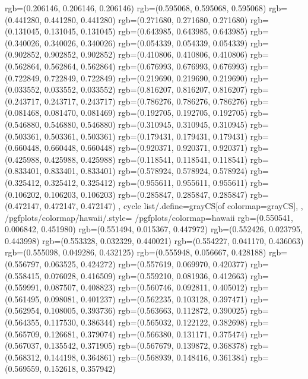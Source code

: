 {{{					rgb=(0.206146, 0.206146, 0.206146)
					rgb=(0.595068, 0.595068, 0.595068)
					rgb=(0.441280, 0.441280, 0.441280)
					rgb=(0.271680, 0.271680, 0.271680)
					rgb=(0.131045, 0.131045, 0.131045)
					rgb=(0.643985, 0.643985, 0.643985)
					rgb=(0.340026, 0.340026, 0.340026)
					rgb=(0.054339, 0.054339, 0.054339)
					rgb=(0.902852, 0.902852, 0.902852)
					rgb=(0.410806, 0.410806, 0.410806)
					rgb=(0.562864, 0.562864, 0.562864)
					rgb=(0.676993, 0.676993, 0.676993)
					rgb=(0.722849, 0.722849, 0.722849)
					rgb=(0.219690, 0.219690, 0.219690)
					rgb=(0.033552, 0.033552, 0.033552)
					rgb=(0.816207, 0.816207, 0.816207)
					rgb=(0.243717, 0.243717, 0.243717)
					rgb=(0.786276, 0.786276, 0.786276)
					rgb=(0.081468, 0.081470, 0.081469)
					rgb=(0.192705, 0.192705, 0.192705)
					rgb=(0.546880, 0.546880, 0.546880)
					rgb=(0.310945, 0.310945, 0.310945)
					rgb=(0.503361, 0.503361, 0.503361)
					rgb=(0.179431, 0.179431, 0.179431)
					rgb=(0.660448, 0.660448, 0.660448)
					rgb=(0.920371, 0.920371, 0.920371)
					rgb=(0.425988, 0.425988, 0.425988)
					rgb=(0.118541, 0.118541, 0.118541)
					rgb=(0.833401, 0.833401, 0.833401)
					rgb=(0.578924, 0.578924, 0.578924)
					rgb=(0.325412, 0.325412, 0.325412)
					rgb=(0.955611, 0.955611, 0.955611)
					rgb=(0.106202, 0.106203, 0.106203)
					rgb=(0.285847, 0.285847, 0.285847)
					rgb=(0.472147, 0.472147, 0.472147)
			},
		cycle list/.define={grayCS}{[of colormap=grayCS]},
		},
		/pgfplots/colormap/hawaii/.style={
			/pgfplots/colormap={hawaii}{%
					rgb=(0.550541, 0.006842, 0.451980)
					rgb=(0.551494, 0.015367, 0.447972)
					rgb=(0.552426, 0.023795, 0.443998)
					rgb=(0.553328, 0.032329, 0.440021)
					rgb=(0.554227, 0.041170, 0.436063)
					rgb=(0.555098, 0.049286, 0.432125)
					rgb=(0.555948, 0.056667, 0.428188)
					rgb=(0.556797, 0.063525, 0.424272)
					rgb=(0.557619, 0.069970, 0.420377)
					rgb=(0.558415, 0.076028, 0.416509)
					rgb=(0.559210, 0.081936, 0.412663)
					rgb=(0.559991, 0.087507, 0.408823)
					rgb=(0.560746, 0.092811, 0.405012)
					rgb=(0.561495, 0.098081, 0.401237)
					rgb=(0.562235, 0.103128, 0.397471)
					rgb=(0.562954, 0.108005, 0.393736)
					rgb=(0.563663, 0.112872, 0.390025)
					rgb=(0.564355, 0.117530, 0.386344)
					rgb=(0.565032, 0.122122, 0.382698)
					rgb=(0.565709, 0.126681, 0.379074)
					rgb=(0.566380, 0.131171, 0.375474)
					rgb=(0.567037, 0.135542, 0.371905)
					rgb=(0.567679, 0.139872, 0.368378)
					rgb=(0.568312, 0.144198, 0.364861)
					rgb=(0.568939, 0.148416, 0.361384)
					rgb=(0.569559, 0.152618, 0.357942)
}}}
